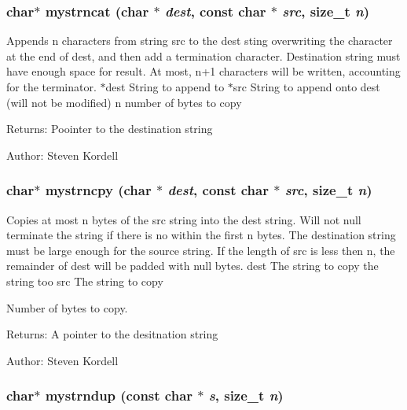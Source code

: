 \subsubsection{\setlength{\rightskip}{0pt plus 5cm}char$\ast$ mystrncat (char $\ast$ {\em dest}, const char $\ast$ {\em src}, size\_\-t {\em n})}\label{mystring_8c_8ccb44f981aac19c052eb611bc38b197}


Appends n characters from string src to the dest sting overwriting the  character at the end of dest, and then add a termination  character. Destination string must have enough space for result. At most, n+1 characters will be written, accounting for the terminator.  $\ast$dest String to append to  $\ast$src String to append onto dest (will not be modified)  n number of bytes to copy \begin{Desc}
\item[Returns:]Poointer to the destination string \end{Desc}
\begin{Desc}
\item[Author:]Steven Kordell \end{Desc}
\subsubsection{\setlength{\rightskip}{0pt plus 5cm}char$\ast$ mystrncpy (char $\ast$ {\em dest}, const char $\ast$ {\em src}, size\_\-t {\em n})}\label{mystring_8c_f8122b3dfcb26b56ac0505030e95adc5}


Copies at most n bytes of the src string into the dest string. Will not null terminate the string if there is no  within the first n bytes. The destination string must be large enough for the source string. If the length of src is less then n, the remainder of dest will be padded with null bytes.  dest The string to copy the string too  src The string to copy \par
 Number of bytes to copy. \begin{Desc}
\item[Returns:]A pointer to the desitnation string \end{Desc}
\begin{Desc}
\item[Author:]Steven Kordell \end{Desc}
\subsubsection{\setlength{\rightskip}{0pt plus 5cm}char$\ast$ mystrndup (const char $\ast$ {\em s}, size\_\-t {\em n})}\label{mystring_8c_d13d3e42cbb0fb06a9c5070850679f8f}


